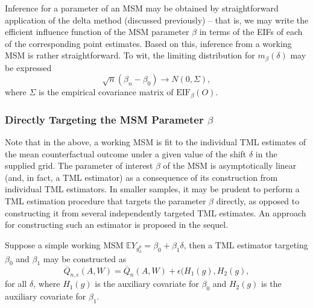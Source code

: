 \documentclass[12pt, krantz2,]{book}
\newenvironment{Shaded}{\begin{snugshade}}{\end{snugshade}}
\newcommand{\CommentTok}[1]{\textcolor[rgb]{0.56,0.35,0.01}{\textit{#1}}}
\newcommand{\DecValTok}[1]{\textcolor[rgb]{0.00,0.00,0.81}{#1}}
\newcommand{\NormalTok}[1]{#1}
\newcommand{\OperatorTok}[1]{\textcolor[rgb]{0.81,0.36,0.00}{\textbf{#1}}}
\theoremstyle{definition}
\theoremstyle{definition}
\theoremstyle{definition}
\newcommand{\1}{\mathbbm{1}}
\begin{document}
Inference for a parameter of an MSM may be obtained by straightforward
application of the delta method (discussed previously) -- that is, we may
write the efficient influence function of the MSM parameter \(\beta\) in terms of
the EIFs of each of the corresponding point estimates. Based on this, inference
from a working MSM is rather straightforward. To wit, the limiting distribution
for \(m_{\beta}(\delta)\) may be expressed \[\sqrt{n}(\beta_n - \beta_0) \to N(0,
\Sigma),\] where \(\Sigma\) is the empirical covariance matrix of
\(\text{EIF}_{\beta}(O)\).

\begin{Shaded}
\end{Shaded}

\hypertarget{directly-targeting-the-msm-parameter-beta}{%
\subsubsection{\texorpdfstring{Directly Targeting the MSM Parameter \(\beta\)}{Directly Targeting the MSM Parameter \textbackslash{}beta}}\label{directly-targeting-the-msm-parameter-beta}}

Note that in the above, a working MSM is fit to the individual TML estimates of
the mean counterfactual outcome under a given value of the shift \(\delta\) in the
supplied grid. The parameter of interest \(\beta\) of the MSM is asymptotically
linear (and, in fact, a TML estimator) as a consequence of its construction from
individual TML estimators. In smaller samples, it may be prudent to perform a
TML estimation procedure that targets the parameter \(\beta\) directly, as opposed
to constructing it from several independently targeted TML estimates. An
approach for constructing such an estimator is proposed in the sequel.

Suppose a simple working MSM \(\mathbb{E}Y_{g^0_{\delta}} = \beta_0 + \beta_1 \delta\), then a TML estimator targeting \(\beta_0\) and \(\beta_1\) may be
constructed as
\[\overline{Q}_{n, \epsilon}(A,W) = \overline{Q}_n(A,W) + \epsilon (H_1(g),
H_2(g),\] for all \(\delta\), where \(H_1(g)\) is the auxiliary covariate for
\(\beta_0\) and \(H_2(g)\) is the auxiliary covariate for \(\beta_1\).
\end{document}

